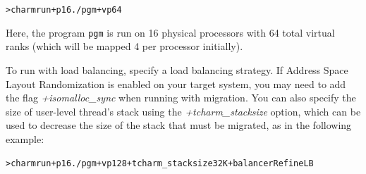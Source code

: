 \documentclass[10pt]{article}
\begin{document}
\begin{alltt}
> charmrun +p16 ./pgm +vp64
\end{alltt}

Here, the \ampi{} program \texttt{pgm} is run on 16 physical processors with
64 total virtual ranks (which will be mapped 4 per processor initially).

To run with load balancing, specify a load balancing strategy. If Address Space
Layout Randomization is enabled on your target system, you may need to add the
flag \emph{+isomalloc\_sync} when running with migration. You can also specify
the size of user-level thread's stack using the \emph{+tcharm\_stacksize}
option, which can be used to decrease the size of the stack that must be
migrated, as in the following example:

\begin{alltt}
> charmrun +p16 ./pgm +vp128 +tcharm_stacksize 32K +balancer RefineLB
\end{alltt}
\end{document}
